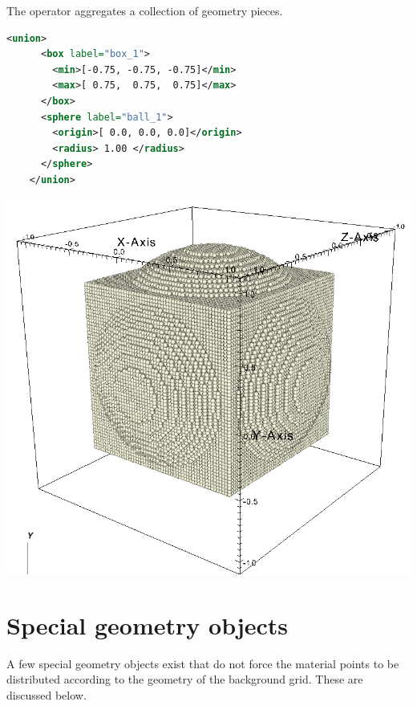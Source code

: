 \begin{minipage}{0.6\textwidth}
  The  operator aggregates a collection of geometry pieces.
  \begin{lstlisting}[language=XML]
    <union>
      <box label="box_1">
        <min>[-0.75, -0.75, -0.75]</min>
        <max>[ 0.75,  0.75,  0.75]</max>
      </box>
      <sphere label="ball_1">
        <origin>[ 0.0, 0.0, 0.0]</origin>
        <radius> 1.00 </radius>
      </sphere>
    </union>
  \end{lstlisting}
\end{minipage}
\begin{minipage}{0.4\textwidth}
  \centering
  \includegraphics[width=0.7\columnwidth]{FIGS/geometry/geom_union.png}
\end{minipage}

\section{Special geometry objects} \label{Sec:SpecialGeometryObjects}
A few special geometry objects exist that do not force the material points
to be distributed according to the geometry of the background grid.
These are discussed below.

